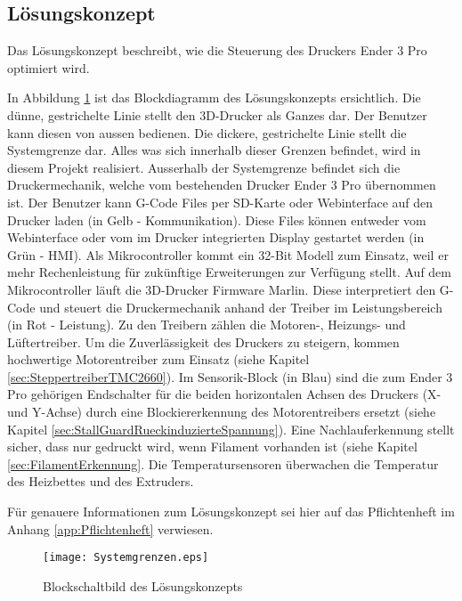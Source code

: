 \subsection{Lösungskonzept}
\label{sec:Lösungskonzept}

Das Lösungskonzept beschreibt, wie die Steuerung des Druckers Ender 3 Pro optimiert wird.

In Abbildung \ref{pic:BlockschaltbildLoesungskonzept} ist das Blockdiagramm des Lösungskonzepts ersichtlich. Die dünne, gestrichelte Linie stellt den 3D-Drucker als Ganzes dar. Der Benutzer kann diesen von aussen bedienen. Die dickere, gestrichelte Linie stellt die Systemgrenze dar. Alles was sich innerhalb dieser Grenzen befindet, wird in diesem Projekt realisiert. Ausserhalb der Systemgrenze befindet sich die Druckermechanik, welche vom bestehenden Drucker Ender 3 Pro übernommen ist.
Der Benutzer kann G-Code Files per SD-Karte oder Webinterface auf den Drucker laden (in Gelb - Kommunikation). Diese Files können entweder vom Webinterface oder vom im Drucker integrierten Display gestartet werden (in Grün - HMI). Als Mikrocontroller kommt ein 32-Bit Modell zum Einsatz, weil er mehr Rechenleistung für zukünftige Erweiterungen zur Verfügung stellt. Auf dem Mikrocontroller läuft die 3D-Drucker Firmware Marlin. Diese interpretiert den G-Code und steuert die Druckermechanik anhand der Treiber im Leistungsbereich (in Rot - Leistung). Zu den Treibern zählen die Motoren-, Heizungs- und Lüftertreiber. Um die Zuverlässigkeit des Druckers zu steigern, kommen hochwertige Motorentreiber zum Einsatz (siehe Kapitel \ref{sec:SteppertreiberTMC2660}). Im Sensorik-Block (in Blau) sind die zum Ender 3 Pro gehörigen Endschalter für die beiden horizontalen Achsen des Druckers (X- und Y-Achse) durch eine Blockiererkennung des Motorentreibers ersetzt (siehe Kapitel \ref{sec:StallGuardRueckinduzierteSpannung}). Eine Nachlauferkennung stellt sicher, dass nur gedruckt wird, wenn Filament vorhanden ist (siehe Kapitel \ref{sec:FilamentErkennung}. Die Temperatursensoren überwachen die Temperatur des Heizbettes und des Extruders.

Für genauere Informationen zum Lösungskonzept sei hier auf das Pflichtenheft im Anhang \ref{app:Pflichtenheft} verwiesen.
%
 

\begin{figure}
	\centering
	\texttt{[image: Systemgrenzen.eps]}
	\caption{Blockschaltbild des Lösungskonzepts}
	\label{pic:BlockschaltbildLoesungskonzept}
\end{figure}


